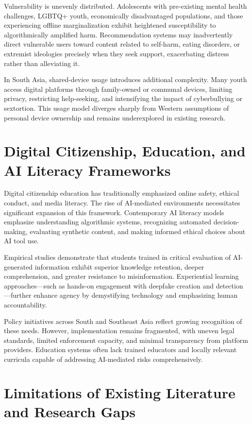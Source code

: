 \documentclass[12pt,a4paper]{report}
\begin{document}
Vulnerability is unevenly distributed. Adolescents with pre-existing mental health challenges, LGBTQ+ youth, economically disadvantaged populations, and those experiencing offline marginalization exhibit heightened susceptibility to algorithmically amplified harm. Recommendation systems may inadvertently direct vulnerable users toward content related to self-harm, eating disorders, or extremist ideologies precisely when they seek support, exacerbating distress rather than alleviating it.

In South Asia, shared-device usage introduces additional complexity. Many youth access digital platforms through family-owned or communal devices, limiting privacy, restricting help-seeking, and intensifying the impact of cyberbullying or sextortion. This usage model diverges sharply from Western assumptions of personal device ownership and remains underexplored in existing research.

\section{Digital Citizenship, Education, and AI Literacy Frameworks}

Digital citizenship education has traditionally emphasized online safety, ethical conduct, and media literacy. The rise of AI-mediated environments necessitates significant expansion of this framework. Contemporary AI literacy models emphasize understanding algorithmic systems, recognizing automated decision-making, evaluating synthetic content, and making informed ethical choices about AI tool use.

Empirical studies demonstrate that students trained in critical evaluation of AI-generated information exhibit superior knowledge retention, deeper comprehension, and greater resistance to misinformation. Experiential learning approaches—such as hands-on engagement with deepfake creation and detection—further enhance agency by demystifying technology and emphasizing human accountability.

Policy initiatives across South and Southeast Asia reflect growing recognition of these needs. However, implementation remains fragmented, with uneven legal standards, limited enforcement capacity, and minimal transparency from platform providers. Education systems often lack trained educators and locally relevant curricula capable of addressing AI-mediated risks comprehensively.

\section{Limitations of Existing Literature and Research Gaps}
\end{document}
